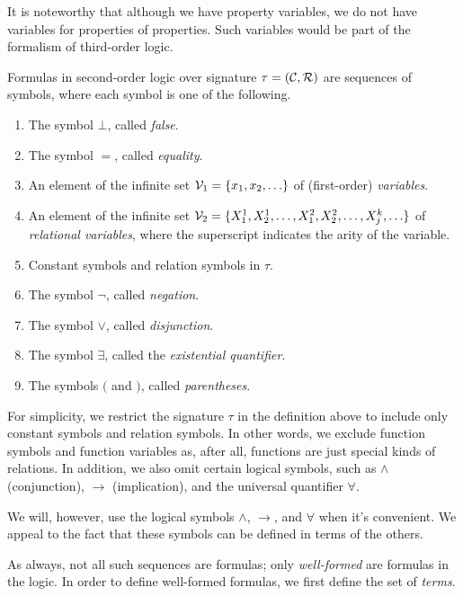 \documentclass[11pt,twoside=off,numbers=noenddot]{scrbook}
\begin{document}
\begin{remark}
  It is noteworthy that although we have property variables, we do not have variables for properties of properties. Such variables would be part of the formalism of third-order logic.
\end{remark}

Formulas in second-order logic over signature $\tau = (\mathcal{C}, \mathcal{R})$ are sequences of symbols, where each symbol is one of the following.
\begin{enumerate}
  \item The symbol $\bot$, called \emph{false}.
  \item The symbol $=$, called \emph{equality}.
  \item An element of the infinite set $\vars_1 = \set{x_1, x_2, \dots}$ of (first-order) \emph{variables}.
  \item An element of the infinite set $\vars_2 = \set{X_1^1, X_2^1, \dots, X_1^2, X_2^2, \dots, X_j^k, \dots}$ of \emph{relational variables}, where the superscript indicates the arity of the variable.
  \item Constant symbols and relation symbols in $\tau$.
  \item The symbol $\neg$, called \emph{negation}.
  \item The symbol $\vee$, called \emph{disjunction}.
  \item The symbol $\exists$, called the \emph{existential quantifier}.
  \item The symbols $($ and $)$, called \emph{parentheses}.
\end{enumerate}

\begin{remark}
  For simplicity, we restrict the signature $\tau$ in the definition above to include only constant symbols and relation symbols. In other words, we exclude function symbols and function variables as, after all, functions are just special kinds of relations. In addition, we also omit certain logical symbols, such as $\wedge$ (conjunction), $\rightarrow$ (implication), and the universal quantifier $\forall$.
\end{remark}

\begin{abuse}
  We will, however, use the logical symbols $\wedge$, $\rightarrow$, and $\forall$ when it's convenient. We appeal to the fact that these symbols can be defined in terms of the others.
\end{abuse}

As always, not all such sequences are formulas; only \emph{well-formed} are formulas in the logic. In order to define well-formed formulas, we first define the set of \emph{terms}.
\end{document}
